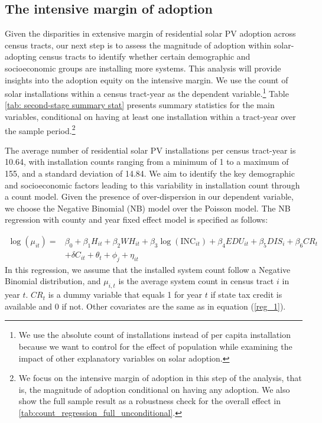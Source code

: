 \documentclass[11pt,twoside,letterpaper]{article}
\begin{document}
\subsection{The intensive margin of adoption}

Given the disparities in extensive margin of residential solar PV adoption across census tracts, our next step is to assess the magnitude of adoption within solar-adopting census tracts to identify whether certain demographic and socioeconomic groups are installing more systems. This analysis will provide insights into the adoption equity on the intensive margin. We use the count of solar installations within a census tract-year as the dependent variable.\footnote{We use the absolute count of installations instead of per capita installation because we want to control for the effect of population while examining the impact of other explanatory variables on solar adoption.} Table \ref{tab: second-stage summary stat} presents summary statistics for the main variables, conditional on having at least one installation within a tract-year over the sample period.\footnote{We focus on the intensive margin of adoption in this step of the analysis, that is, the magnitude of adoption conditional on having any adoption. We also show the full sample result as a robustness check for the overall effect in \autoref{tab:count_regression_full_unconditional}.}

The average number of residential solar PV installations per census tract-year is 10.64, with installation counts ranging from a minimum of 1 to a maximum of 155, and a standard deviation of 14.84. We aim to identify the key demographic and socioeconomic factors leading to this variability in installation count through a count model. Given the presence of over-dispersion in our dependent variable, we choose the Negative Binomial (NB) model over the Poisson model. The NB regression with county and year fixed effect model is specified as follows:

\begin{equation}
\label{reg_2}
\begin{aligned}
\log(\mu_{it}) =& \beta_{0} + \beta_{1}H_{it} + \beta_{2}WH_{it} + \beta_{3}\log(\text{INC}_{it}) + \beta_{4}EDU_{it} + \beta_{5}DIS_{i} + \beta_{6}CR_{t} \\
& + \delta C_{it} + \theta_{t} + \phi_{j} + \eta_{it}
\end{aligned}
\end{equation}
In this regression, we assume that the installed system count follow a Negative Binomial distribution, and $\mu_{i,t}$ is the average system count in census tract $i$ in year $t$. $CR_t$ is a dummy variable that equals 1 for year $t$ if state tax credit is available and 0 if not. Other covariates are the same as in equation (\ref{reg_1}).
\end{document}
